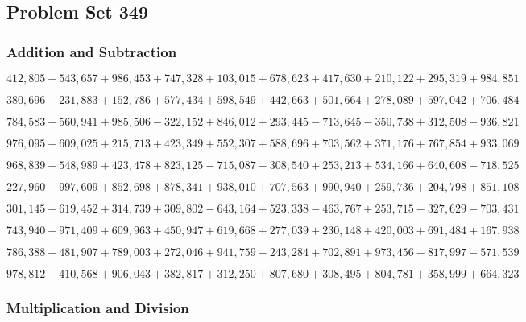 \hypertarget{problem-set-349}{%
\subsection{Problem Set 349}\label{problem-set-349}}

\hypertarget{addition-and-subtraction}{%
\subsubsection{Addition and
Subtraction}\label{addition-and-subtraction}}

\(412,805+543,657+986,453+747,328+103,015+678,623+417,630+210,122+295,319+984,851\)

\(380,696+231,883+152,786+577,434+598,549+442,663+501,664+278,089+597,042+706,484\)

\(784,583+560,941+985,506-322,152+846,012+293,445-713,645-350,738+312,508-936,821\)

\(976,095+609,025+215,713+423,349+552,307+588,696+703,562+371,176+767,854+933,069\)

\(968,839-548,989+423,478+823,125-715,087-308,540+253,213+534,166+640,608-718,525\)

\(227,960+997,609+852,698+878,341+938,010+707,563+990,940+259,736+204,798+851,108\)

\(301,145+619,452+314,739+309,802-643,164+523,338-463,767+253,715-327,629-703,431\)

\(743,940+971,409+609,963+450,947+619,668+277,039+230,148+420,003+691,484+167,938\)

\(786,388-481,907+789,003+272,046+941,759-243,284+702,891+973,456-817,997-571,539\)

\(978,812+410,568+906,043+382,817+312,250+807,680+308,495+804,781+358,999+664,323\)

\hypertarget{multiplication-and-division}{%
\subsubsection{Multiplication and
Division}\label{multiplication-and-division}}

